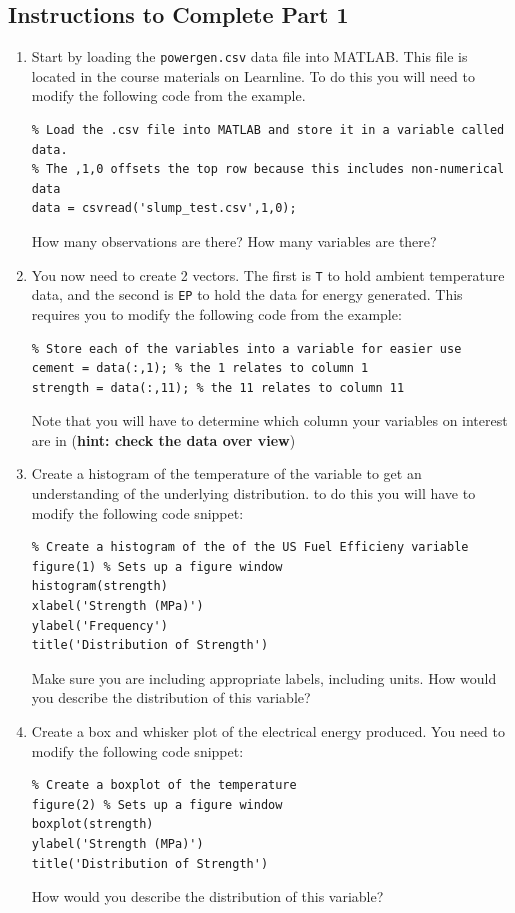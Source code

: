 \documentclass[12pt]{article}
\begin{document}
\subsection*{Instructions to Complete Part 1}
\begin{enumerate}
\item Start by loading the \verb|powergen.csv| data file into MATLAB. This file is located in the course materials on Learnline. To do this you will need to modify the following code from the example.
\vspace{-0.4cm}
\begin{lstlisting}
% Load the .csv file into MATLAB and store it in a variable called data.
% The ,1,0 offsets the top row because this includes non-numerical data
data = csvread('slump_test.csv',1,0);
\end{lstlisting}

How many observations are there? How many variables are there?
 
\item You now need to create 2 vectors. The first is \verb|T| to hold ambient temperature data, and the second is \verb|EP| to hold the data for energy generated. This requires you to modify the following code from the example:
\vspace{-0.4cm}
\begin{lstlisting}
% Store each of the variables into a variable for easier use
cement = data(:,1); % the 1 relates to column 1
strength = data(:,11); % the 11 relates to column 11
\end{lstlisting}

Note that you will have to determine which column your variables on interest are in (\textbf{hint: check the data over view})
\newpage
\item Create a histogram of the temperature of the variable to get an understanding of the underlying distribution. to do this you will have to modify the following code snippet:
\vspace{-0.8cm}
\begin{lstlisting}
% Create a histogram of the of the US Fuel Efficieny variable
figure(1) % Sets up a figure window
histogram(strength)
xlabel('Strength (MPa)')
ylabel('Frequency')
title('Distribution of Strength')
\end{lstlisting}

Make sure you are including appropriate labels, including units. How would you describe the distribution of this variable?

\item Create a box and whisker plot of the electrical energy produced. You need to modify the following code snippet:
\vspace{-0.4cm}
\begin{lstlisting}
% Create a boxplot of the temperature
figure(2) % Sets up a figure window
boxplot(strength)
ylabel('Strength (MPa)')
title('Distribution of Strength')
\end{lstlisting}
How would you describe the distribution of this variable?


\end{enumerate}
\end{document}
